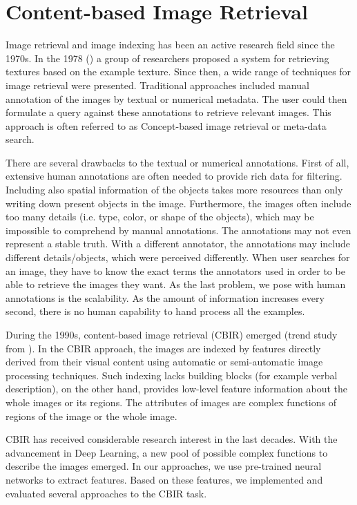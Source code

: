 \chapter{Content-based Image Retrieval}
\label{ch:content_based}

Image retrieval and image indexing has been an active research field since the 1970s. In the 1978 (\cite{tamura1978textural}) a group of researchers proposed a system for retrieving textures based on the example texture. Since then, a wide range of techniques for image retrieval were presented. Traditional approaches included manual annotation of the images by textual or numerical metadata. The user could then formulate a query against these annotations to retrieve relevant images. This approach is often referred to as Concept-based image retrieval or meta-data search.

There are several drawbacks to the textual or numerical annotations. First of all, extensive human annotations are often needed to provide rich data for filtering. Including also spatial information of the objects takes more resources than only writing down present objects in the image. Furthermore, the images often include too many details (i.e. type, color, or shape of the objects), which may be impossible to comprehend by manual annotations.  The annotations may not even represent a stable truth. With a different annotator, the annotations may include different details/objects, which were perceived differently. When user searches for an image, they have to know the exact terms the annotators used in order to be able to retrieve the images they want. As the last problem, we pose with human annotations is the scalability. As the amount of information increases every second, there is no human capability to hand process all the examples.

During the 1990s, content-based image retrieval (CBIR) emerged (trend study from \cite{datta2008image}). In the CBIR approach, the images are indexed by features directly derived from their visual content using automatic or semi-automatic image processing techniques. Such indexing lacks building blocks (for example verbal description), on the other hand, provides low-level feature information about the whole images or its regions. The attributes of images are complex functions of regions of the image or the whole image.

CBIR has received considerable research interest in the last decades. With the advancement in Deep Learning, a new pool of possible complex functions to describe the images emerged. In our approaches, we use pre-trained neural networks to extract features. Based on these features, we implemented and evaluated several approaches to the CBIR task.

